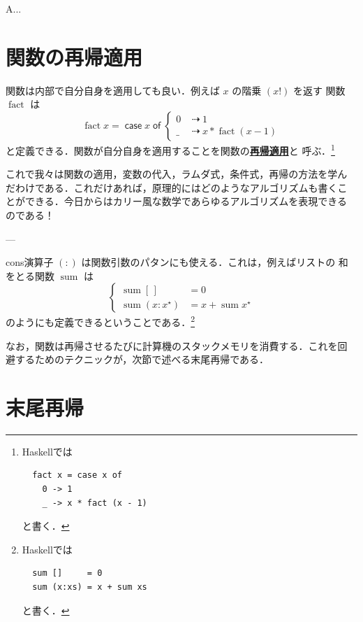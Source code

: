 \documentclass[a5paper,twoside,fleqn,draft]{jsbook}
\newcommand{\programminglanguage}[1]{\textsf{#1}}
\newcommand{\haskell}{\programminglanguage{Haskell}}
\newenvironment{leader}{\begingroup\gt}{\endgroup}
\newcommand{\keyword}[1]{{\underline{\textbf{#1}}}}
\newcommand{\mKeyword}[1]{\mathsf{#1}}
\newcommand{\mCaseKeyword}{\mKeyword{case}}
\newcommand{\mOfKeyword}{\mKeyword{of}}
\DeclareMathOperator{\mCaseKW}{\mCaseKeyword}
\DeclareMathOperator{\mOfKW}{\mOfKeyword}
\newcommand{\mEmptyList}{{[\,]}}
\newcommand{\mSpecialFunc}[1]{#1}
\DeclareMathOperator{\mFact}{\mSpecialFunc{fact}}
\DeclareMathOperator{\mSum}{\mSpecialFunc{sum}}
\DeclareMathOperator{\mIfSo}{\dashrightarrow}
\newcommand{\mList}[1]{{#1}^\mathrm{\star}}
\newcommand{\mCaseOf}[1]{\mCaseKW#1\mOfKW}
\begin{document}
\begin{leader}
A...
\end{leader}

\section{関数の再帰適用}

関数は内部で自分自身を適用しても良い．例えば $x$ の階乗 $(x!)$ を返す
関数 $\mFact$ は
\begin{equation}
  \mFact x
  =\mCaseOf{x}
  \begin{cases}
    0
    &\mIfSo1\\
    \_
    &\mIfSo x*\mFact(x-1)
  \end{cases}
\end{equation}
と定義できる．関数が自分自身を適用することを関数の\keyword{再帰適用}と
呼ぶ．\footnote{\haskell では
\begin{verbatim}
  fact x = case x of
    0 -> 1
    _ -> x * fact (x - 1)
\end{verbatim}
と書く．}

これで我々は関数の適用，変数の代入，ラムダ式，条件式，再帰の方法を学ん
だわけである．これだけあれば，原理的にはどのようなアルゴリズムも書くこ
とができる．今日からはカリー風な数学であらゆるアルゴリズムを表現できる
のである！

---

cons演算子 $(:)$ は関数引数のパタンにも使える．これは，例えばリストの
和をとる関数 $\mSum$ は
\begin{equation}
  \left\{
  \begin{aligned}
    \mSum\mEmptyList
    &=0\\
    \mSum(x:\mList{x})
    &=x+\mSum\mList{x}
  \end{aligned}
  \right.
\end{equation}
のようにも定義できるということである．\footnote{\haskell では
\begin{verbatim}
  sum []     = 0
  sum (x:xs) = x + sum xs
\end{verbatim}
と書く．}

なお，関数は再帰させるたびに計算機のスタックメモリを消費する．これを回
避するためのテクニックが，次節で述べる末尾再帰である．

\section{末尾再帰}
\end{document}
